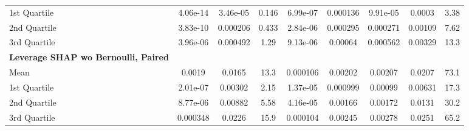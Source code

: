 {\begin{tabular} {lcccccccc}
\hspace{7pt}1st Quartile & 4.06e-14 & \cellcolor{silver!60}3.46e-05 & \cellcolor{silver!60}0.146 & \cellcolor{silver!60}6.99e-07 & \cellcolor{gold!60}0.000136 & \cellcolor{silver!60}9.91e-05 & \cellcolor{gold!60}0.0003 & \cellcolor{gold!60}3.38 \\ 
\hspace{7pt}2nd Quartile & \cellcolor{bronze!60}3.83e-10 & \cellcolor{silver!60}0.000206 & \cellcolor{silver!60}0.433 & \cellcolor{bronze!60}2.84e-06 & \cellcolor{gold!60}0.000295 & \cellcolor{silver!60}0.000271 & \cellcolor{gold!60}0.00109 & \cellcolor{gold!60}7.62 \\ 
\hspace{7pt}3rd Quartile & 3.96e-06 & \cellcolor{silver!60}0.000492 & \cellcolor{silver!60}1.29 & \cellcolor{bronze!60}9.13e-06 & \cellcolor{silver!60}0.00064 & \cellcolor{silver!60}0.000562 & \cellcolor{gold!60}0.00329 & \cellcolor{gold!60}13.3 \\ 
\addlinespace[1ex] 
\textbf{Leverage SHAP wo Bernoulli, Paired} &  &  &  &  &  &  &  &  \\ 
\hspace{7pt}Mean & 0.0019 & 0.0165 & 13.3 & 0.000106 & 0.00202 & 0.00207 & 0.0207 & 73.1 \\ 
\hspace{7pt}1st Quartile & 2.01e-07 & 0.00302 & 2.15 & 1.37e-05 & 0.000999 & 0.00099 & 0.00631 & 17.3 \\ 
\hspace{7pt}2nd Quartile & 8.77e-06 & 0.00882 & 5.58 & 4.16e-05 & 0.00166 & 0.00172 & 0.0131 & 30.2 \\ 
\hspace{7pt}3rd Quartile & 0.000348 & 0.0226 & 15.9 & 0.000104 & 0.00245 & 0.00278 & 0.0251 & 65.2 \\ 
\bottomrule
\end{tabular}}